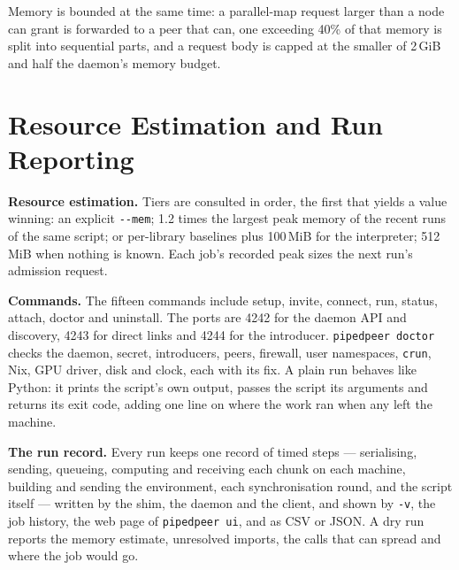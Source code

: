Memory is bounded at the same time: a parallel-map request larger than a node
can grant is forwarded to a peer that can, one exceeding 40\% of that memory is
split into sequential parts, and a request body is capped at the smaller of
2\,GiB and half the daemon's memory budget.

\section{Resource Estimation and Run Reporting}
\label{sec:observe}

\textbf{Resource estimation.} Tiers are consulted in order, the first that
yields a value winning: an explicit \texttt{-{}-mem}; 1.2 times the largest peak
memory of the recent runs of the same script; or per-library baselines plus
100\,MiB for the interpreter; 512\,MiB when nothing is known. Each job's
recorded peak sizes the next run's admission request.

\textbf{Commands.} The fifteen commands include setup, invite,
connect, run, status, attach, doctor and uninstall. The ports are 4242 for the
daemon API and discovery, 4243 for direct links and 4244 for the introducer.
\texttt{pipedpeer doctor} checks the daemon, secret, introducers, peers,
firewall, user namespaces, \texttt{crun}, Nix, GPU driver, disk and clock, each
with its fix. A plain run
behaves like Python: it prints the script's own output, passes the script its
arguments and returns its exit code, adding one line on where the work ran when
any left the machine.

\textbf{The run record.} Every run keeps one record of timed steps ---
serialising, sending, queueing, computing and receiving each chunk on each
machine, building and sending the environment, each synchronisation round, and
the script itself --- written by the shim, the daemon and the client, and shown
by \texttt{-v}, the job history, the web page of \texttt{pipedpeer ui}, and as
CSV or JSON. A dry run reports the memory estimate, unresolved imports, the
calls that can spread and where the job would go.
